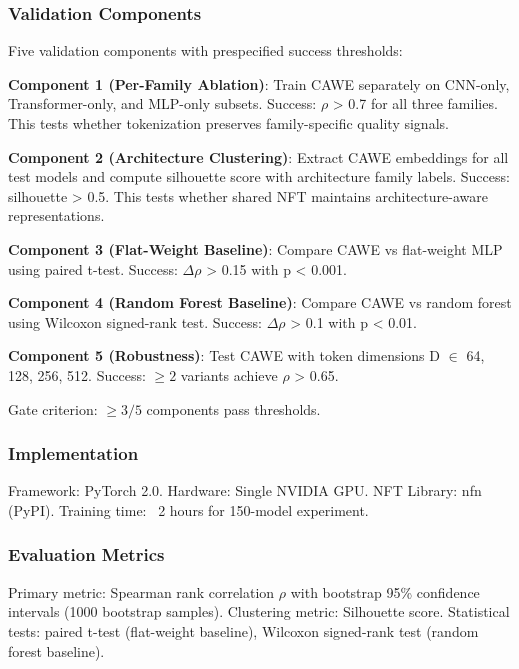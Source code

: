 \subsubsection{Validation Components}

Five validation components with prespecified success thresholds:

\textbf{Component 1 (Per-Family Ablation)}: Train CAWE separately on CNN-only, Transformer-only, and MLP-only subsets. Success: $\rho$ > 0.7 for all three families. This tests whether tokenization preserves family-specific quality signals.

\textbf{Component 2 (Architecture Clustering)}: Extract CAWE embeddings for all test models and compute silhouette score with architecture family labels. Success: silhouette > 0.5. This tests whether shared NFT maintains architecture-aware representations.

\textbf{Component 3 (Flat-Weight Baseline)}: Compare CAWE vs flat-weight MLP using paired t-test. Success: $\Delta\rho$ > 0.15 with p < 0.001.

\textbf{Component 4 (Random Forest Baseline)}: Compare CAWE vs random forest using Wilcoxon signed-rank test. Success: $\Delta\rho$ > 0.1 with p < 0.01.

\textbf{Component 5 (Robustness)}: Test CAWE with token dimensions D $\in$ {64, 128, 256, 512}. Success: $\geq 2$ variants achieve $\rho$ > 0.65.

Gate criterion: $\geq 3/5$ components pass thresholds.

\subsubsection{Implementation}

Framework: PyTorch 2.0. Hardware: Single NVIDIA GPU. NFT Library: nfn (PyPI). Training time: ~2 hours for 150-model experiment.

\subsubsection{Evaluation Metrics}

Primary metric: Spearman rank correlation $\rho$ with bootstrap 95\% confidence intervals (1000 bootstrap samples). Clustering metric: Silhouette score. Statistical tests: paired t-test (flat-weight baseline), Wilcoxon signed-rank test (random forest baseline).
